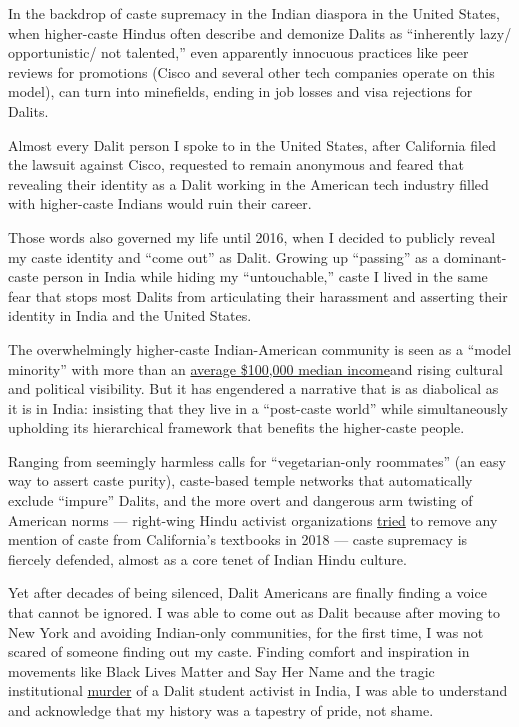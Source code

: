 In the backdrop of caste supremacy in the Indian diaspora in the United
States, when higher-caste Hindus often describe and demonize Dalits as
``inherently lazy/ opportunistic/ not talented,'' even apparently
innocuous practices like peer reviews for promotions (Cisco and several
other tech companies operate on this model), can turn into minefields,
ending in job losses and visa rejections for Dalits.

Almost every Dalit person I spoke to in the United States, after
California filed the lawsuit against Cisco, requested to remain
anonymous and feared that revealing their identity as a Dalit working in
the American tech industry filled with higher-caste Indians would ruin
their career.

Those words also governed my life until 2016, when I decided to publicly
reveal my caste identity and ``come out'' as Dalit. Growing up
``passing'' as a dominant-caste person in India while hiding my
``untouchable,'' caste I lived in the same fear that stops most Dalits
from articulating their harassment and asserting their identity in India
and the United States.

The overwhelmingly higher-caste Indian-American community is seen as a
``model minority'' with more than an
\href{https://www8.gsb.columbia.edu/articles/chazen-global-insights/singular-population-indian-immigrants-america}{average
\$100,000 median income}and rising cultural and political visibility.
But it has engendered a narrative that is as diabolical as it is in
India: insisting that they live in a ``post-caste world'' while
simultaneously upholding its hierarchical framework that benefits the
higher-caste people.

Ranging from seemingly harmless calls for ``vegetarian-only roommates''
(an easy way to assert caste purity), caste-based temple networks that
automatically exclude ``impure'' Dalits, and the more overt and
dangerous arm twisting of American norms --- right-wing Hindu activist
organizations
\href{https://www.nytimes3xbfgragh.onion/2016/05/06/us/debate-erupts-over-californias-india-history-curriculum.html}{tried}
to remove any mention of caste from California's textbooks in 2018 ---
caste supremacy is fiercely defended, almost as a core tenet of Indian
Hindu culture.

Yet after decades of being silenced, Dalit Americans are finally finding
a voice that cannot be ignored. I was able to come out as Dalit because
after moving to New York and avoiding Indian-only communities, for the
first time, I was not scared of someone finding out my caste. Finding
comfort and inspiration in movements like Black Lives Matter and Say Her
Name and the tragic institutional
\href{https://www.theguardian.com/global-development/2020/feb/19/coming-out-as-dalit-how-one-indian-author-finally-embraced-her-identity}{murder}
of a Dalit student activist in India, I was able to understand and
acknowledge that my history was a tapestry of pride, not shame.


